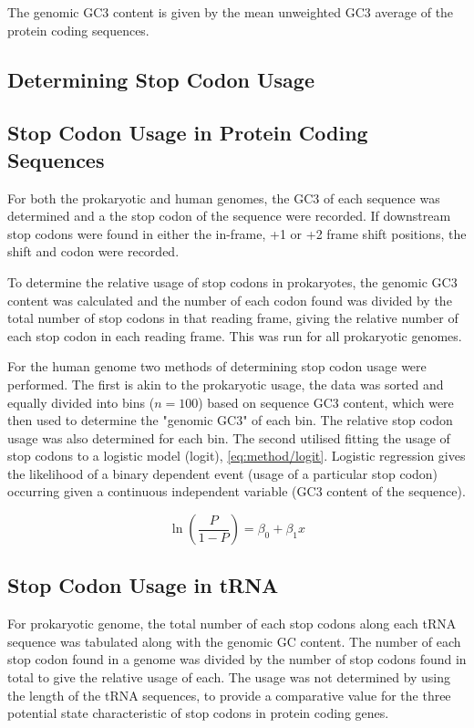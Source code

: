 \documentclass[../main.tex]{subfile}
\begin{document}
        The genomic GC3 content is given by the mean unweighted GC3 average of the protein coding sequences.
    \subsection{Determining Stop Codon Usage}
        \subsection{Stop Codon Usage in Protein Coding Sequences}
            For both the prokaryotic and human genomes, the GC3 of each sequence was determined and a the stop codon of the sequence were recorded. If downstream stop codons were found in either the in-frame, +1 or +2 frame shift positions, the shift and codon were recorded.

            To determine the relative usage of stop codons in prokaryotes, the genomic GC3 content was calculated and the number of each codon found was divided by the total number of stop codons in that reading frame, giving the relative number of each stop codon in each reading frame. This was run for all prokaryotic genomes.

            For the human genome two methods of determining stop codon usage were performed.
            The first is akin to the prokaryotic usage, the data was sorted and equally divided into bins ($n=100$) based on sequence GC3 content, which were then used to determine the "genomic GC3" of each bin. The relative stop codon usage was also determined for each bin.
            The second utilised fitting the usage of stop codons to a logistic model (logit), \cref{eq:method/logit}. Logistic regression gives the likelihood of a binary dependent event (usage of a particular stop codon) occurring given a continuous independent variable (GC3 content of the sequence).

            \begin{equation}
                \ln\left(\frac{P}{1-P}\right) = \beta_0 + \beta_1 x \label{eq:method/logit}
            \end{equation}
        \subsection{Stop Codon Usage in tRNA}
            For prokaryotic genome, the total number of each stop codons along each tRNA sequence was tabulated along with the genomic GC content. The number of each stop codon found in a genome was divided by the number of stop codons found in total to give the relative usage of each. The usage was not determined by using the length of the tRNA sequences, to provide a comparative value for the three potential state characteristic of stop codons in protein coding genes.
\end{document}
